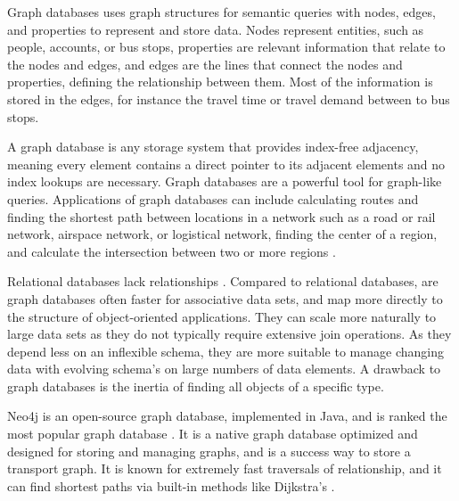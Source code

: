Graph databases uses graph structures for semantic queries with nodes, edges, and properties to represent and store data.
Nodes represent entities, such as people, accounts, or bus stops, properties are relevant information that relate to the nodes and edges, and edges are the lines that connect the nodes and properties, defining the relationship between them. Most of the information is stored in the edges, for instance the travel time or travel demand between to bus stops. 

A graph database is any storage system that provides index-free adjacency, meaning every element contains a direct pointer to its adjacent elements and no index lookups are necessary. Graph databases are a powerful tool for graph-like queries. Applications of graph databases can include calculating routes and finding the shortest path between locations in a network such as a road or rail network, airspace network, or logistical network, finding the center of a region, and calculate the intersection between two or more regions \citep{robinson13}.


Relational databases lack relationships \citep{robinson13}. Compared to relational databases, are graph databases often faster for associative data sets, and map more directly to the structure of object-oriented applications. They can scale more naturally to large data sets as they do not typically require extensive join operations. As they depend less on an inflexible schema, they are more suitable to manage changing data with evolving schema's on large numbers of data elements. A drawback to graph databases is the inertia of finding all objects of a specific type. 

Neo4j \citep{website:neo4j} is an open-source graph database, implemented in Java, and is ranked the most popular graph database \citep{website:graphdbranking}. It is a native graph database optimized and designed for storing and managing graphs, and is a success way to store a transport graph. It is known for extremely fast traversals of relationship, and it can find shortest paths via built-in methods like Dijkstra's \citep{robinson13}. 




